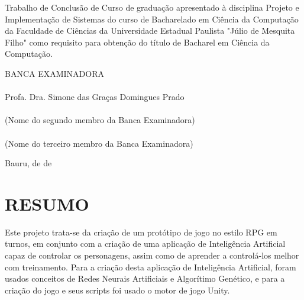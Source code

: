 \documentclass[12pt,a4paper]{article}
\begin{document}
\begin{articleobjective}
	Trabalho de Conclusão de Curso de graduação apresentado à disciplina Projeto e Implementação de Sistemas do curso de Bacharelado em Ciência da Computação da Faculdade de Ciências da Universidade Estadual Paulista "Júlio de Mesquita Filho"{} como requisito para obtenção do título de Bacharel em Ciência da Computação.
\end{articleobjective}

\begin{center}
	\vspace{1.0cm}
	BANCA EXAMINADORA\\
	
	\vspace{1.0cm}
	\underline{\hspace{8cm}}\\
	Profa. Dra. Simone das Graças Domingues Prado\\
	\vspace{1.0cm}
	\underline{\hspace{8cm}}\\
	(Nome do segundo membro da Banca Examinadora)\\
	\vspace{1.0cm}
	\underline{\hspace{8cm}}\\
	(Nome do terceiro membro da Banca Examinadora)

	\vspace*{\fill} %
	Bauru, \underline{\hspace{1cm}} de \underline{\hspace{3cm}} de \underline{\hspace{1.5cm}}
\end{center}

\newpage %
\thispagestyle{empty} %
\section*{\hfil RESUMO} %
	\singlespace
	\noindent
	Este projeto trata-se da criação de um protótipo de jogo no estilo RPG em turnos,
	em conjunto com a criação de uma aplicação de Inteligência Artificial capaz de controlar os personagens,
	assim como de aprender a controlá-los melhor com treinamento.
	Para a criação desta aplicação de Inteligência Artificial,
	foram usados conceitos de Redes Neurais Artificiais e Algorítimo Genético,
	e para a criação do jogo e seus scripts
	foi usado o motor de jogo Unity.
	
\end{document}
